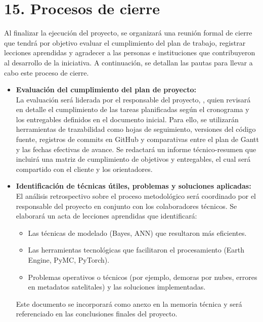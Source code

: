 \documentclass[
11pt, %
]{charter}
\begin{document}
\section{15. Procesos de cierre}    
\label{sec:cierre}

Al finalizar la ejecución del proyecto, se organizará una reunión formal de cierre que tendrá por objetivo evaluar el cumplimiento del plan de trabajo, registrar lecciones aprendidas y agradecer a las personas e instituciones que contribuyeron al desarrollo de la iniciativa. A continuación, se detallan las pautas para llevar a cabo este proceso de cierre.

\begin{itemize}
    \item \textbf{Evaluación del cumplimiento del plan de proyecto:}\\
    La evaluación será liderada por el responsable del proyecto, \authorname, quien revisará en detalle el cumplimiento de las tareas planificadas según el cronograma y los entregables definidos en el documento inicial. Para ello, se utilizarán herramientas de trazabilidad como hojas de seguimiento, versiones del código fuente, registros de commits en GitHub y comparativas entre el plan de Gantt y las fechas efectivas de avance. Se redactará un informe técnico-resumen que incluirá una matriz de cumplimiento de objetivos y entregables, el cual será compartido con el cliente y los orientadores.

    \item \textbf{Identificación de técnicas útiles, problemas y soluciones aplicadas:}\\
    El análisis retrospectivo sobre el proceso metodológico será coordinado por el responsable del proyecto en conjunto con los colaboradores técnicos. Se elaborará un acta de lecciones aprendidas que identificará:
    \begin{itemize}
        \item Las técnicas de modelado (Bayes, ANN) que resultaron más eficientes.
        \item Las herramientas tecnológicas que facilitaron el procesamiento (Earth Engine, PyMC, PyTorch).
        \item Problemas operativos o técnicos (por ejemplo, demoras por nubes, errores en metadatos satelitales) y las soluciones implementadas.
    \end{itemize}
    Este documento se incorporará como anexo en la memoria técnica y será referenciado en las conclusiones finales del proyecto.


\end{itemize}
\end{document}
